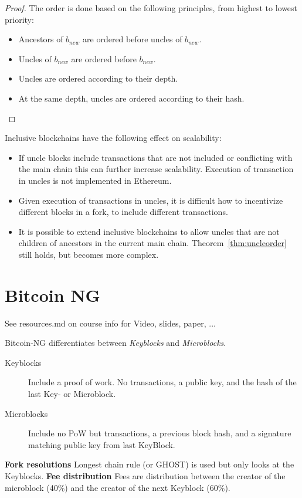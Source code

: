 \begin{proof}
	The order is done based on the following principles, from highest to lowest priority:
	\begin{itemize}
		\item Ancestors of $b_{new}$ are ordered before uncles of $b_{new}$.
		\item Uncles of $b_{new}$ are ordered before $b_{new}$.
		\item Uncles are ordered according to their depth.
		\item At the same depth, uncles are ordered according to their hash.
	\end{itemize}
\end{proof}

\begin{note}
Inclusive blockchains have the following effect on scalability:
\begin{itemize}
	\item If uncle blocks include transactions that are not included or conflicting with the main chain this can further increase scalability. Execution of transaction in uncles is not implemented in Ethereum.
	\item Given execution of transactions in uncles, it is difficult how to incentivize different blocks in a fork, to include different transactions.
	\item It is possible to extend inclusive blockchains to allow uncles that are not children of ancestors in the current main chain. Theorem~\ref{thm:uncleorder} still holds, but becomes more complex.
\end{itemize}
\end{note}

\section{Bitcoin NG}
See resources.md on course info for Video, slides, paper, ...

\begin{definition} Bitcoin-NG differentiates between \emph{Keyblocks} and \emph{Microblocks}. 
	\begin{description}
		\item[Keyblocks] Include a proof of work. No transactions, a public key, and the hash of the last Key- or Microblock.
		\item[Microblocks] Include no PoW but transactions, a previous block hash, and a signature matching public key from last KeyBlock.
	\end{description}

	\noindent
	\textbf{Fork resolutions} Longest chain rule (or GHOST) is used but only looks at the Keyblocks.
	\textbf{Fee distribution} Fees are distribution between the creator of the microblock (40\%) and the creator of the next Keyblock (60\%).
\end{definition}

